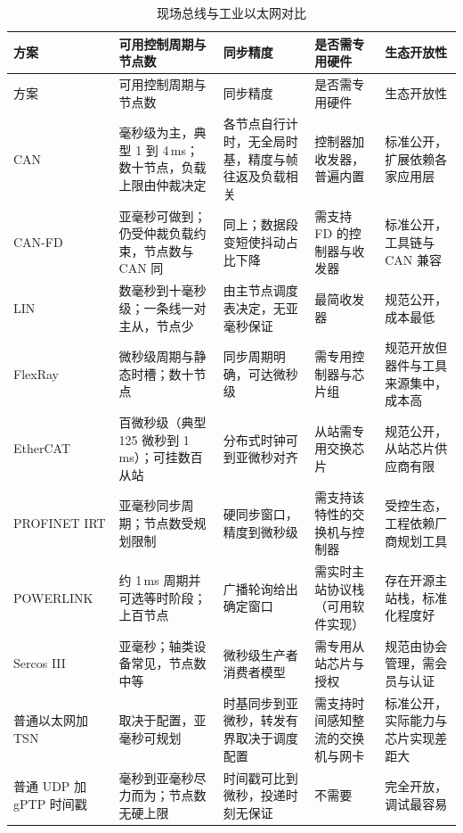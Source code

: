 \documentclass[12pt,a4paper,fontset=fandol]{ctexbook}
\newcommand{\Bk}{\discretionary{}{}{}}
\begin{document}
\begin{longtable}{>{\raggedright\arraybackslash\footnotesize}p{}>{\raggedright\arraybackslash\footnotesize}p{}>{\raggedright\arraybackslash\footnotesize}p{}>{\raggedright\arraybackslash\footnotesize}p{}>{\raggedright\arraybackslash\footnotesize}p{}}
\caption{现场总线与工业以太网对比}\label{tab:apC-bus} \\
\toprule
方案 & 可用控制周期与节点数 & 同步精度 & 是否需专用硬件 & 生态开放性 \\
\midrule
\endfirsthead
\toprule
方案 & 可用控制周期与节点数 & 同步精度 & 是否需专用硬件 & 生态开放性 \\
\midrule
\endhead
\bottomrule
\endfoot
\endlastfoot
CAN & 毫秒级为主，典型 1 到 4\,ms；数十节点，负载上限由仲裁决定 & 各节点自行计时，无全局时基，精度与帧往返及负载相关 & 控制器加收发器，普遍内置 & 标准公开，扩展依赖各家应用层 \\
CAN-FD & 亚毫秒可做到；仍受仲裁负载约束，节点数与 CAN 同 & 同上；数据段变短使抖动占比下降 & 需支持 FD 的控制器与收发器 & 标准公开，工具链与 CAN 兼容 \\
LIN & 数毫秒到十毫秒级；一条线一对主从，节点少 & 由主节点调度表决定，无亚毫秒保证 & 最简收发器 & 规范公开，成本最低 \\
FlexRay & 微秒级周期与静态时槽；数十节点 & 同步周期明确，可达微秒级 & 需专用控制器与芯片组 & 规范开放但器件与工具来源集中，成本高 \\
EtherCAT & 百微秒级（典型 125 微秒到 1\,ms）；可挂数百从站 & 分布式时钟可到亚微秒对齐 & 从站需专用交换芯片 & 规范公开，从站芯片供应商有限 \\
PROFINET IRT & 亚毫秒同步周期；节点数受规划限制 & 硬同步窗口，精度到微秒级 & 需支持该特性的交换机与控制器 & 受控生态，工程依赖厂商规划工具 \\
POWER{\Bk}LINK & 约 1\,ms 周期并可选等时阶段；上百节点 & 广播轮询给出确定窗口 & 需实时主站协议栈（可用软件实现） & 存在开源主站栈，标准化程度好 \\
Sercos III & 亚毫秒；轴类设备常见，节点数中等 & 微秒级生产者消费者模型 & 需专用从站芯片与授权 & 规范由协会管理，需会员与认证 \\
普通以太网加 TSN & 取决于配置，亚毫秒可规划 & 时基同步到亚微秒，转发有界取决于调度配置 & 需支持时间感知整流的交换机与网卡 & 标准公开，实际能力与芯片实现差距大 \\
普通 UDP 加 gPTP 时间戳 & 毫秒到亚毫秒尽力而为；节点数无硬上限 & 时间戳可比到微秒，投递时刻无保证 & 不需要 & 完全开放，调试最容易 \\
\end{longtable}
\end{document}

